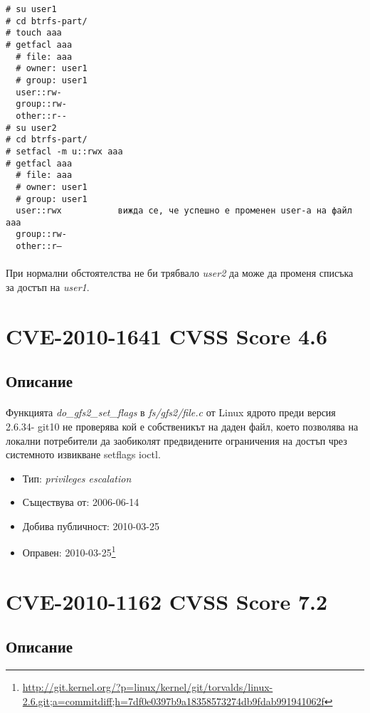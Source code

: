 \documentclass[a4paper,12pt,leqno]{article}
\begin{document}
\begin{verbatim}
# su user1
# cd btrfs-part/
# touch aaa
# getfacl aaa
  # file: aaa
  # owner: user1
  # group: user1
  user::rw-
  group::rw-
  other::r--
# su user2
# cd btrfs-part/
# setfacl -m u::rwx aaa
# getfacl aaa
  # file: aaa
  # owner: user1
  # group: user1
  user::rwx           вижда се, че успешно е променен user-а на файл aaa
  group::rw-
  other::r—
\end{verbatim}
\paragraph{}
При нормални обстоятелства не би трябвало \textit{user2} да може да променя 
списъка за достъп на \textit{user1}.


\section{CVE-2010-1641 CVSS Score 4.6}
\subsection{Описание}
\paragraph{}
Функцията \textit{do\_gfs2\_set\_flags} в \textit{fs/gfs2/file.c} от Linux ядрото преди версия 2.6.34-
git10 не проверява кой е собственикът на даден файл, което позволява на локални потребители да заобиколят предвидените ограничения на достъп чрез системното извикване setflags ioctl.

\begin{itemize}
    \item Тип: \textit{privileges escalation}
    \item Съществува от: 2006-06-14
  	\item Добива публичност: 2010-03-25
    \item Оправен: 2010-03-25\footnote{\url{http://git.kernel.org/?p=linux/kernel/git/torvalds/linux-2.6.git;a=commitdiff;h=7df0e0397b9a18358573274db9fdab991941062f}}
\end{itemize}

\section{CVE-2010-1162 CVSS Score 7.2}
\subsection{Описание}
\end{document}
